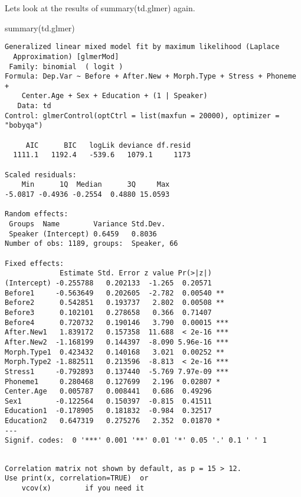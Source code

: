 \documentclass[
  10pt,
  letterpaper]{article}
\newenvironment{Shaded}{\begin{snugshade}}{\end{snugshade}}
\newcommand{\FunctionTok}[1]{\textcolor[rgb]{0.28,0.35,0.67}{#1}}
\newcommand{\NormalTok}[1]{\textcolor[rgb]{0.00,0.23,0.31}{#1}}
\renewcommand\texttt[1]{{\ttfamily\color{BrickRed}#1}}
\begin{document}
Lets look at the results of \texttt{summary(td.glmer)} again.

\begin{Shaded}
\begin{Highlighting}[]
\FunctionTok{summary}\NormalTok{(td.glmer)}
\end{Highlighting}
\end{Shaded}

\begin{verbatim}
Generalized linear mixed model fit by maximum likelihood (Laplace
  Approximation) [glmerMod]
 Family: binomial  ( logit )
Formula: Dep.Var ~ Before + After.New + Morph.Type + Stress + Phoneme +  
    Center.Age + Sex + Education + (1 | Speaker)
   Data: td
Control: glmerControl(optCtrl = list(maxfun = 20000), optimizer = "bobyqa")

     AIC      BIC   logLik deviance df.resid 
  1111.1   1192.4   -539.6   1079.1     1173 

Scaled residuals: 
    Min      1Q  Median      3Q     Max 
-5.0817 -0.4936 -0.2554  0.4880 15.0593 

Random effects:
 Groups  Name        Variance Std.Dev.
 Speaker (Intercept) 0.6459   0.8036  
Number of obs: 1189, groups:  Speaker, 66

Fixed effects:
             Estimate Std. Error z value Pr(>|z|)    
(Intercept) -0.255788   0.202133  -1.265  0.20571    
Before1     -0.563649   0.202605  -2.782  0.00540 ** 
Before2      0.542851   0.193737   2.802  0.00508 ** 
Before3      0.102101   0.278658   0.366  0.71407    
Before4      0.720732   0.190146   3.790  0.00015 ***
After.New1   1.839172   0.157358  11.688  < 2e-16 ***
After.New2  -1.168199   0.144397  -8.090 5.96e-16 ***
Morph.Type1  0.423432   0.140168   3.021  0.00252 ** 
Morph.Type2 -1.882511   0.213596  -8.813  < 2e-16 ***
Stress1     -0.792893   0.137440  -5.769 7.97e-09 ***
Phoneme1     0.280468   0.127699   2.196  0.02807 *  
Center.Age   0.005787   0.008441   0.686  0.49296    
Sex1        -0.122564   0.150397  -0.815  0.41511    
Education1  -0.178905   0.181832  -0.984  0.32517    
Education2   0.647319   0.275276   2.352  0.01870 *  
---
Signif. codes:  0 '***' 0.001 '**' 0.01 '*' 0.05 '.' 0.1 ' ' 1
\end{verbatim}

\begin{verbatim}

Correlation matrix not shown by default, as p = 15 > 12.
Use print(x, correlation=TRUE)  or
    vcov(x)        if you need it
\end{verbatim}
\end{document}
